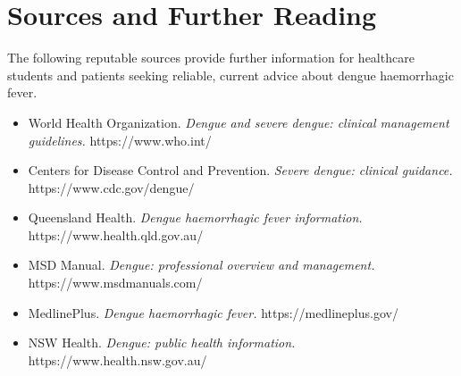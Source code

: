 \section*{Sources and Further Reading}
The following reputable sources provide further information for healthcare students and patients seeking reliable, current advice about dengue haemorrhagic fever.

\begin{itemize}
    \item World Health Organization. \textit{Dengue and severe dengue: clinical management guidelines.} https://www.who.int/
    \item Centers for Disease Control and Prevention. \textit{Severe dengue: clinical guidance.} https://www.cdc.gov/dengue/
    \item Queensland Health. \textit{Dengue haemorrhagic fever information.} https://www.health.qld.gov.au/
    \item MSD Manual. \textit{Dengue: professional overview and management.} https://www.msdmanuals.com/
    \item MedlinePlus. \textit{Dengue haemorrhagic fever.} https://medlineplus.gov/
    \item NSW Health. \textit{Dengue: public health information.} https://www.health.nsw.gov.au/
\end{itemize}
